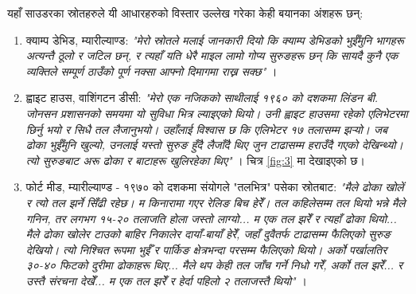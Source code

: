 \documentclass[10pt,twocolumn,letterpaper]{article}
\begin{document}
यहाँ साउडरका स्रोतहरुले यी आधारहरुको विस्तार उल्लेख गरेका केही बयानका अंशहरू छन्:
\begin{flushleft}
\begin{enumerate}
    \item क्याम्प डेभिड, म्यारील्याण्ड: \textit{"मेरो स्रोतले मलाई जानकारी दियो कि क्याम्प डेभिडको भुईँमुनि भागहरू अत्यन्तै ठूलो र जटिल छन्, र त्यहाँ यति धेरै माइल लामो गोप्य सुरुङहरू छन् कि सायदै कुनै एक व्यक्तिले सम्पूर्ण ठाउँको पूर्ण नक्सा आफ्नो दिमागमा राख्न सक्छ"} \cite{22}।
    \item ह्वाइट हाउस, वाशिंगटन डीसी: \textit{"मेरो एक नजिकको साथीलाई १९६० को दशकमा लिंडन बी. जोनसन प्रशासनको समयमा यो सुविधा भित्र ल्याइएको थियो। उनी ह्वाइट हाउसमा रहेको एलिभेटरमा छिर्नु भयो र सिधै तल लैजानुभयो। उहाँलाई विश्वास छ कि एलिभेटर १७ तलासम्म झर्‍यो। जब ढोका भुईँमुनि खुल्यो, उनलाई यस्तो सुरुङ हुँदै लैजाँदै थिए जुन टाढासम्म हराउँदै गएको देखिन्थ्यो। त्यो सुरुङबाट अरू ढोका र बाटाहरू खुलिरहेका थिए"} \cite{22}। चित्र \ref{fig:3} मा देखाइएको छ।
    \item फोर्ट मीड, म्यारील्याण्ड - १९७० को दशकमा संयोगले "तलभित्र" पसेका स्रोतबाट: \textit{"मैले ढोका खोलें र त्यो तल झर्ने सिँढी रहेछ। म किनारामा गएर रेलिङ बिच हेरेँ। तल कहिलेसम्म तल थियो भन्ने मैले गनिन, तर लगभग १५-२० तलाजति होला जस्तो लाग्यो... म एक तल झरेँ र त्यहाँ ढोका थियो... मैले ढोका खोलेर टाउको बाहिर निकालेर दायाँ-बायाँ हेरेँ, जहाँ दुवैतर्फ टाढासम्म फैलिएको सुरुङ देखियो। त्यो निश्चित रूपमा भुईँ र पार्किङ क्षेत्रभन्दा परसम्म फैलिएको थियो। अर्को पर्खालतिर ३०-४० फिटको दुरीमा ढोकाहरू थिए... मैले थप केही तल जाँच गर्ने निधो गरेँ, अर्को तल झरेँ... र उस्तै संरचना देखेँ... म एक तल झरेँ र हेर्दा पहिलो २ तलाजस्तै थियो"} \cite{22}।
\end{enumerate}
\end{flushleft}
\end{document}
